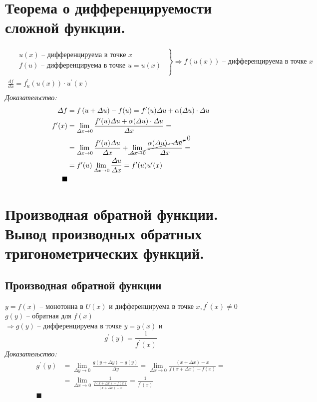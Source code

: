 \documentclass[12pt, fleqn]{article}
\begin{document}
\section{Теорема о дифференцируемости сложной функции. }
\begin{multline*}
	\left .
	\begin{gathered}
		\begin{aligned}
			&u(x)\text{ -- дифференцируема в точке }x\\
			&f(u)\text{ -- дифференцируема в точке }u=u(x)\\
		\end{aligned}
	\end{gathered}
	\right\}\Rightarrow f(u(x))\text{ -- дифференцируема в точке } x\\
	\frac{df}{dx}=f_u^\prime\left(u(x)\right)\cdot u^\prime(x)\\	
\end{multline*}
\textit{Доказательство:}
\begin{align*}
	\varDelta f&=f\left(u+\varDelta u\right)-f(u)=f^\prime(u)\varDelta u + \alpha(\varDelta u)\cdot\varDelta u\\
	f^\prime(x)&=\lim_{\varDelta x \to 0}\frac{f^\prime(u)\varDelta u + \alpha(\varDelta u)\cdot \varDelta u}{\varDelta x}=\\
	&=\lim_{\varDelta x \to 0}\frac{f^\prime(u)\varDelta u}{\varDelta x} + \cancelto{0}{\lim_{\varDelta x \to 0}\frac{\alpha(\varDelta u)\cdot \varDelta u}{\varDelta x}}=\\
	&=f^\prime(u)\lim_{\varDelta x \to 0}\frac{\varDelta u}{\varDelta x}=f^\prime(u)u^\prime(x)\\
	\blacksquare\\
\end{align*}
\section{Производная обратной функции. Вывод производных обратных тригонометрических функций. }
\subsection{Производная обратной функции}
$y=f(x)$ -- монотонна в $U(x)$ и дифференцируема в точке $x, f^\prime(x)\neq0$\\
$g(y)$ -- обратная для $f(x)$\\
$\Rightarrow g(y)$ -- дифференцируема в точке $y=y(x)$ и $$g^\prime(y)=\frac{1}{f^\prime(x)}$$
\textit{Доказательство:}
\begin{align*}
	g^\prime(y)&=\lim_{\varDelta y \to 0}\frac{g(y+\varDelta y)-g(y)}{\varDelta y}=\lim_{\varDelta x \to 0}\frac{(x+\varDelta x) - x}{f(x+\varDelta x)-f(x)}=\\
	&=\lim_{\varDelta x \to 0}\frac{1}{\frac{f(x+\varDelta x)-f(x)}{(x+\varDelta x) - x}}=\frac{1}{f^\prime(x)}\\
	\blacksquare\\
\end{align*}
\end{document}
